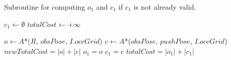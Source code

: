 \begin{algorithm}[H]
  \begin{algorithmic}[1]

    \caption{Subroutine for computing $o_{1}$ and $c_{1}$ if $c_{1}$ is not already valid.}

    \label{alg:04-custom-observation-simple-compute01c1}

      \State $c_{1} \gets \emptyset$
      \State $totalCost \gets +\infty$

        \State $o \gets A$*($R$, $obsPose$, $I.occGrid$)
        \State $c \gets A$*($obsPose$, $pushPose$, $I.occGrid$)
        \State $newTotalCost = |o| + |c|$
          \State $o_{1} = o$
          \State $c_{1} = c$
          \State $totalCost = |o_{1}| + |c_{1}|$
        \EndIf
      \EndFor
    \EndProcedure

  \end{algorithmic}
\end{algorithm}
